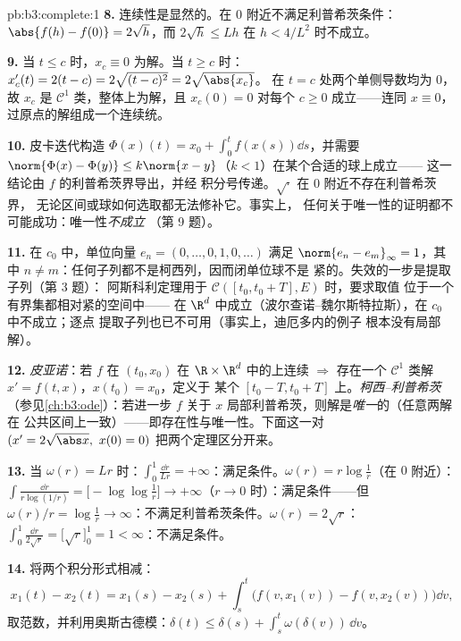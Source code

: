 \begin{solution}{pb:b3:complete:1}
\textbf{8.} 连续性是显然的。在 $0$ 附近不满足利普希茨条件：
$\abs{f(h) - f(0)} = 2\sqrt h$，而 $2\sqrt h \leq L h$
在 $h < 4/L^2$ 时不成立。

\textbf{9.} 当 $t \leq c$ 时，$x_c \equiv 0$ 为解。当 $t \geq
c$ 时：$x_c'(t) = 2(t - c) = 2\sqrt{(t-c)^2} = 2\sqrt{\abs{x_c}}$。
在 $t = c$ 处两个单侧导数均为 $0$，故 $x_c$
是 $\mathcal C^1$ 类，整体上为解，且 $x_c(0) = 0$ 对每个
$c \geq 0$ 成立——连同 $x \equiv 0$，
过原点的解组成一个连续统。

\textbf{10.} 皮卡迭代构造 $\Phi(x)(t) = x_0 +
\int_0^t f(x(s))\dd s$，并需要 $\norm{\Phi(x) - \Phi(y)}
\leq k\norm{x - y}$（$k < 1$）在某个合适的球上成立——
这一结论由 $f$ 的利普希茨界导出，并经
积分号传递。$\sqrt\cdot$ 在 $0$ 附近不存在利普希茨界，
无论区间或球如何选取都无法修补它。事实上，
任何关于唯一性的证明都不可能成功：唯一性\emph{不成立}
（第 9 题）。

\textbf{11.} 在 $c_0$ 中，单位向量 $e_n = (0, \dots, 0, 1,
0, \dots)$ 满足 $\norm{e_n - e_m}_\infty = 1$，其中 $n \neq
m$：任何子列都不是柯西列，因而闭单位球不是
紧的。失效的一步是提取子列（第 3 题）：
阿斯科利定理用于 $\mathcal C([t_0, t_0+T], E)$ 时，要求取值
位于一个有界集都相对紧的空间中——
在 $\R^d$ 中成立（波尔查诺--魏尔斯特拉斯），在 $c_0$ 中不成立；逐点
提取子列也已不可用（事实上，迪厄多内的例子
根本没有局部解）。

\textbf{12.} \emph{皮亚诺}：若 $f$ 在
$(t_0, x_0)$ 在 $\R\times\R^d$ 中的上连续 $\Rightarrow$ 存在一个
$\mathcal C^1$ 类解 $x' = f(t,x)$，$x(t_0) = x_0$，定义于
某个 $[t_0 - T, t_0 + T]$ 上。\emph{柯西--利普希茨}
（参见\cref{ch:b3:ode}）：若进一步 $f$ 关于
$x$ 局部利普希茨，则解是\emph{唯一}的（任意两解在
公共区间上一致）——即存在性与唯一性。下面这一对
$(x' = 2\sqrt{\abs x},\ x(0) = 0)$ 把两个定理区分开来。

\textbf{13.} 当 $\omega(r) = Lr$ 时：$\int_0^1\frac{\dd r}{Lr} =
+\infty$：满足条件。$\omega(r) = r\log\frac1r$（在 $0$ 附近）：
$\int\frac{\dd r}{r\log(1/r)} = \bigl[-\log\log\frac1r\bigr]
\to +\infty$（$r \to 0$ 时）：满足条件——但 $\omega(r)/r =
\log\frac1r \to \infty$：不满足利普希茨条件。$\omega(r) = 2\sqrt
r$：$\int_0^1\frac{\dd r}{2\sqrt r} = \bigl[\sqrt r\bigr]_0^1
= 1 < \infty$：不满足条件。

\textbf{14.} 将两个积分形式相减：
\[
x_1(t) - x_2(t) = x_1(s) - x_2(s) + \int_s^t\bigl(f(v,
x_1(v)) - f(v, x_2(v))\bigr)\dd v,
\]
取范数，并利用奥斯古德模：$\delta(t) \leq
\delta(s) + \int_s^t\omega(\delta(v))\,\dd v$。


\end{solution}
